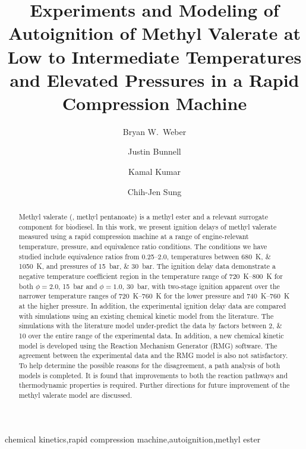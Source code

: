 \documentclass[letterpaper, review]{elsarticle}
\begin{document}
\begin{frontmatter}
\title{ Experiments and Modeling of Autoignition of Methyl Valerate at Low to Intermediate Temperatures and Elevated Pressures in a Rapid Compression Machine }

\author[uconn]{Bryan W.\ Weber}
\author[uconn]{Justin Bunnell}
\author[idaho]{Kamal Kumar}
\author[uconn]{Chih-Jen Sung}
\address[uconn]{Department of Mechanical Engineering, University of Connecticut, Storrs, CT, USA}
\address[idaho]{Department of Mechanical Engineering, University of Idaho, Moscow, ID, USA}

\begin{abstract} %
    Methyl valerate (, methyl pentanoate) is a methyl ester and a relevant surrogate
    component for biodiesel. In this work, we present ignition delays of methyl valerate measured
    using a rapid compression machine at a range of engine-relevant temperature, pressure, and
    equivalence ratio conditions. The conditions we have studied include equivalence ratios from
    \numrange{0.25}{2.0}, temperatures between \SIlist{680;1050}{\K}, and pressures of
    \SIlist{15;30}{\bar}. The ignition delay data demonstrate a negative temperature coefficient
    region in the temperature range of \SIrange[range-phrase={--}]{720}{800}{\K} for both
    \(\phi=2.0\), \SI{15}{\bar} and \(\phi=1.0\), \SI{30}{\bar}, with two-stage ignition apparent
    over the narrower temperature ranges of \SIrange[range-phrase={--}]{720}{760}{\K} for the lower
    pressure and \SIrange[range-phrase={--}]{740}{760}{\K} at the higher pressure. In addition, the
    experimental ignition delay data are compared with simulations using an existing chemical
    kinetic model from the literature. The simulations with the literature model under-predict the
    data by factors between \numlist{2;10} over the entire range of the experimental data. In
    addition, a new chemical kinetic model is developed using the Reaction Mechanism Generator (RMG)
    software. The agreement between the experimental data and the RMG model is also not
    satisfactory. To help determine the possible reasons for the disagreement, a path analysis of
    both models is completed. It is found that improvements to both the reaction pathways and
    thermodynamic properties is required. Further directions for future improvement of the methyl
    valerate model are discussed.
\end{abstract}

\begin{keyword}
    chemical kinetics\sep rapid compression machine\sep autoignition\sep methyl ester
\end{keyword}
\end{frontmatter}
\end{document}
